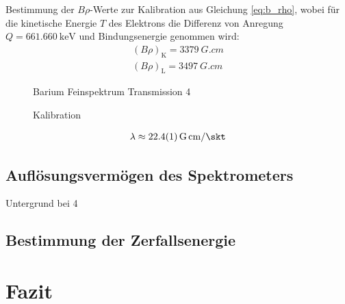 \documentclass[11pt, a4paper]{article}
\numberwithin{equation}{section}
\begin{document}
Bestimmung der $B\rho$-Werte zur Kalibration aus Gleichung \ref{eq:b_rho}, wobei für die kinetische Energie $T$ des Elektrons die Differenz von Anregung $Q = \SI{661,660}{\kilo\electronvolt}$ und Bindungsenergie genommen wird:
\begin{align}
	\left(B \rho \right)_\mathrm{K} = \SI{3379}{G.cm} \\
	\left(B \rho \right)_\mathrm{L} = \SI{3497}{G.cm}
\end{align}

\begin{figure}[h]
	\centering
	
	\caption{Barium Feinspektrum Transmission 4}
	\label{fig:ba_t4_grob}
\end{figure}

\begin{figure}[h]
	\centering
	
	\caption{Kalibration}
	\label{fig:kalibration}
\end{figure}
\begin{align}
	\lambda \approx \SI{22.4 +- 0.1}{G.cm\per\skt}
\end{align}

\subsection{Auflösungsvermögen des Spektrometers}

\begin{table}[h]
	\centering
	
	\caption{Untergrund  bei 4}
	\label{tab:untergrund_ba4}
\end{table}
\subsection{Bestimmung der Zerfallsenergie}


\section{Fazit}
\end{document}
